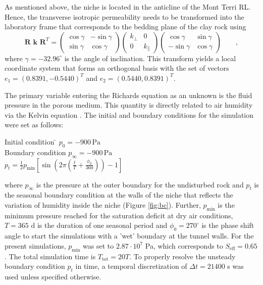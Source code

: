 As mentioned above, the niche is located in the anticline of the Mont Terri RL. Hence, the transverse isotropic permeability needs to be transformed into the laboratory frame that corresponds to the bedding plane of the clay rock using
\begin{equation}\label{eq:permeabilities}
\textbf{R k R}^T = \begin{pmatrix} \cos \gamma & -\sin \gamma \\ \sin \gamma & \cos \gamma \end{pmatrix}
\begin{pmatrix} k_\perp & 0 \\ 0 & k_\parallel \end{pmatrix}
\begin{pmatrix} \cos \gamma & \sin \gamma \\ -\sin \gamma & \cos \gamma \end{pmatrix} \qquad ,
\end{equation}
where $\gamma=-32.96^{\circ}$ is the angle of inclination. This transform yields a local coordinate system that forms an orthogonal basis with the set of vectors $e_1=(0.8391,-0.5440)^T$ and $e_2=(0.5440,0.8391)^T$.

The primary variable entering the Richards equation as an unknown is the fluid pressure in the porous medium. This quantity is directly related to air humidity via the Kelvin equation \cite{bond2013}. The initial and boundary conditions for the simulation were set as follows:
\begin{tabbing}
Initial condition \hspace{2cm} \=	$p_0 = -900 \, \text{Pa}$ \\
Boundary condition 	\>				$p_\infty = -900 \, \text{Pa}$ \\
					\>				$p_t = \frac{1}{2}p_\text{min}\left[\sin\left(2 \pi \left( \frac{t}{T}+ \frac{\phi_0}{360}\right)\right) - 1\right]$ \\
\end{tabbing}
where $p_\infty$ is the pressure at the outer boundary for the undisturbed rock and $p_t$ is the seasonal boundary condition at the walls of the niche that reflects the variation of humidity inside the niche (Figure \ref{fig:bc}). Further, $p_\text{min}$ is the minimum pressure reached for the saturation deficit at dry air conditions, $T=365\text{ d}$ is the duration of one seasonal period and $\phi_0=270^{\circ}$ is the phase shift angle to start the simulations with a 'wet'  boundary at the tunnel walls. For the present simulations, $p_\text{min}$ was set to $2.87 \cdot 10^7$ Pa, which corresponds to $S_\text{eff}=0.65$. The total simulation time is $T_\text{tot}= 20T$. To properly resolve the unsteady boundary condition $p_t$ in time, a temporal discretization of $\Delta t = 21400$ s was used unless specified otherwise. 

